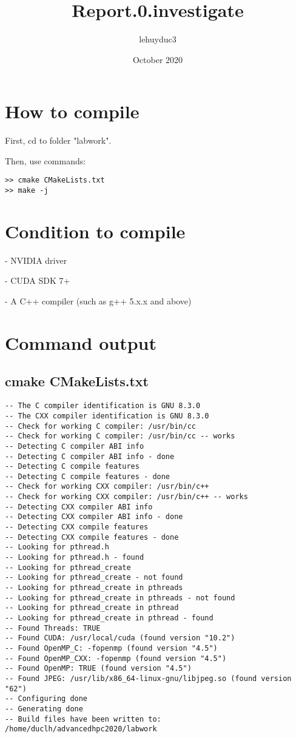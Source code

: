\documentclass{article}
\title{Report.0.investigate}
\author{lehuyduc3 }
\date{October 2020}
\begin{document}
\maketitle

\section{How to compile}
First, cd to folder "labwork".

Then, use commands: \\
\begin{verbatim}
>> cmake CMakeLists.txt
>> make -j    
\end{verbatim}


\section{Condition to compile}
- NVIDIA driver 

- CUDA SDK 7+

- A C++ compiler (such as g++ 5.x.x and above)

\section{Command output}
\subsection{cmake CMakeLists.txt}
\begin{verbatim}
-- The C compiler identification is GNU 8.3.0
-- The CXX compiler identification is GNU 8.3.0
-- Check for working C compiler: /usr/bin/cc
-- Check for working C compiler: /usr/bin/cc -- works
-- Detecting C compiler ABI info
-- Detecting C compiler ABI info - done
-- Detecting C compile features
-- Detecting C compile features - done
-- Check for working CXX compiler: /usr/bin/c++
-- Check for working CXX compiler: /usr/bin/c++ -- works
-- Detecting CXX compiler ABI info
-- Detecting CXX compiler ABI info - done
-- Detecting CXX compile features
-- Detecting CXX compile features - done
-- Looking for pthread.h
-- Looking for pthread.h - found
-- Looking for pthread_create
-- Looking for pthread_create - not found
-- Looking for pthread_create in pthreads
-- Looking for pthread_create in pthreads - not found
-- Looking for pthread_create in pthread
-- Looking for pthread_create in pthread - found
-- Found Threads: TRUE
-- Found CUDA: /usr/local/cuda (found version "10.2")
-- Found OpenMP_C: -fopenmp (found version "4.5")
-- Found OpenMP_CXX: -fopenmp (found version "4.5")
-- Found OpenMP: TRUE (found version "4.5")
-- Found JPEG: /usr/lib/x86_64-linux-gnu/libjpeg.so (found version "62")
-- Configuring done
-- Generating done
-- Build files have been written to: /home/duclh/advancedhpc2020/labwork
\end{verbatim}
\end{document}
